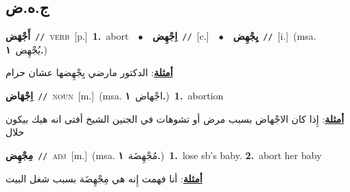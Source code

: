 \documentclass[10pt,a4paper,twoside]{article} %
\begin{document}
\begin{multicols}{2}
\vspace{-3mm}
\subsection*{\color{blue}\foreignlanguage{arabic}{ج.ه.ض}\color{blue}{}} 

{\setlength\topsep{0pt}\textbf{\foreignlanguage{arabic}{أَجْهَض}}\ {\color{gray}\texttt{//}\color{black}}\ \textsc{verb}\ [p.]\ \textbf{1.}~abort\ \ $\bullet$\ \ \setlength\topsep{0pt}\textbf{\foreignlanguage{arabic}{اِجْهِض}}\ {\color{gray}\texttt{//}\color{black}}\ [c.]\ \ $\bullet$\ \ \setlength\topsep{0pt}\textbf{\foreignlanguage{arabic}{يِجْهِض}}\ {\color{gray}\texttt{//}\color{black}}\ [i.]\ \color{gray}(msa. \foreignlanguage{arabic}{يُجْهِض}~\foreignlanguage{arabic}{\textbf{١.}})\color{black}\  \begin{flushright}\color{gray}\foreignlanguage{arabic}{\textbf{\underline{\foreignlanguage{arabic}{أمثلة}}}: الدكتور مارضي يِجْهِضها عشان حرام}\end{flushright}\color{black}} \vspace{2mm}

{\setlength\topsep{0pt}\textbf{\foreignlanguage{arabic}{اِجْهَاض}}\ {\color{gray}\texttt{//}\color{black}}\ \textsc{noun}\ [m.]\ \color{gray}(msa. \foreignlanguage{arabic}{اجْهاض}~\foreignlanguage{arabic}{\textbf{١.}})\color{black}\ \textbf{1.}~abortion\  \begin{flushright}\color{gray}\foreignlanguage{arabic}{\textbf{\underline{\foreignlanguage{arabic}{أمثلة}}}: إِذا كان الاجْهاض بسبب مرض أو تشوهات في الجنين الشيخ أفتى انه هيك بيكون حلال}\end{flushright}\color{black}} \vspace{2mm}

{\setlength\topsep{0pt}\textbf{\foreignlanguage{arabic}{مِجْهِض}}\ {\color{gray}\texttt{//}\color{black}}\ \textsc{adj}\ [m.]\ \color{gray}(msa. \foreignlanguage{arabic}{مُجْهِضَة}~\foreignlanguage{arabic}{\textbf{١.}})\color{black}\ \textbf{1.}~lose sb's baby.  \textbf{2.}~abort her baby\  \begin{flushright}\color{gray}\foreignlanguage{arabic}{\textbf{\underline{\foreignlanguage{arabic}{أمثلة}}}: أنا فهمت إِنه هي مِجْهِضَة بسبب شغل البيت}\end{flushright}\color{black}} \vspace{2mm}


\end{multicols}
\end{document}
